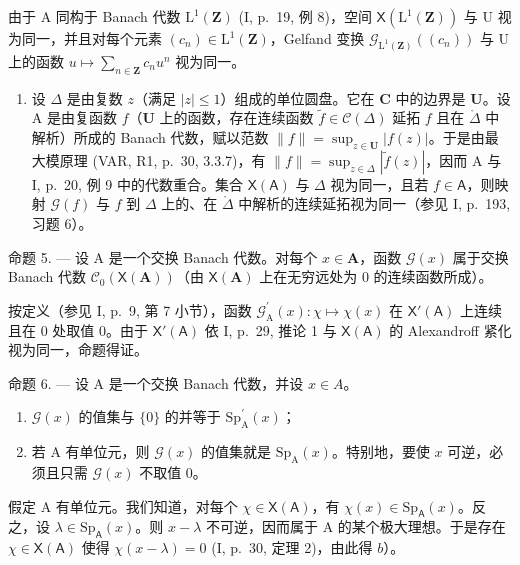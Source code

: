 由于 A 同构于 Banach 代数 \(\mathrm{L}^{1}(\mathbf{Z})\) (I, p.~19, 例 8)，空间 \(\mathsf{X}(\mathrm{L}^{1}(\mathbf{Z}))\) 与 U 视为同一，并且对每个元素 \((c_{n})\in\mathrm{L}^{1}(\mathbf{Z})\)，Gelfand 变换 \(\mathcal{G}_{\mathrm{L}^{1}(\mathbf{Z})}((c_{n}))\) 与 U 上的函数 \(u\mapsto\sum_{n\in\mathbf{Z}}c_{n}u^{n}\) 视为同一。

\begin{enumerate}
\def\labelenumi{\arabic{enumi})}
\setcounter{enumi}{4}
\tightlist
\item
  设 \(\Delta\) 是由复数 \(z\)（满足 \(|z| \leqslant 1\)）组成的单位圆盘。它在 \(\mathbf{C}\) 中的边界是 \(\mathbf{U}\)。设 A 是由复函数 \(f\)（\(\mathbf{U}\) 上的函数，存在连续函数 \(\widetilde{f} \in \mathcal{C}(\Delta)\) 延拓 \(f\) 且在 \(\mathring{\Delta}\) 中解析）所成的 Banach 代数，赋以范数 \(\|f\| = \sup_{z \in \mathbf{U}} |f(z)|\)。于是由最大模原理 (VAR, R1, p.~30, 3.3.7)，有 \(\|f\| = \sup_{z \in \Delta} |\widetilde{f}(z)|\)，因而 A 与 I, p.~20, 例 9 中的代数重合。集合 \(\mathsf{X}(\mathsf{A})\) 与 \(\Delta\) 视为同一，且若 \(f \in \mathsf{A}\)，则映射 \(\mathcal{G}(f)\) 与 \(f\) 到 \(\Delta\) 上的、在 \(\mathring{\Delta}\) 中解析的连续延拓视为同一（参见 I, p.~193, 习题 6）。
\end{enumerate}

命题 5. --- 设 A 是一个交换 Banach 代数。对每个 \(x \in \mathbf{A}\)，函数 \(\mathcal{G}(x)\) 属于交换 Banach 代数 \(\mathcal{C}_0(\mathsf{X}(\mathbf{A}))\)（由 \(\mathsf{X}(\mathbf{A})\) 上在无穷远处为 0 的连续函数所成）。

按定义（参见 I, p.~9, 第 7 小节），函数 \(\mathcal{G}_{\mathrm{A}}^{\prime}(x)\colon \chi \mapsto \chi (x)\) 在 \(\mathsf{X}'(\mathsf{A})\) 上连续且在 0 处取值 0。由于 \(\mathsf{X}'(\mathsf{A})\) 依 I, p.~29, 推论 1 与 \(\mathsf{X}(\mathsf{A})\) 的 Alexandroff 紧化视为同一，命题得证。

命题 6. --- 设 A 是一个交换 Banach 代数，并设 \(x \in A\)。

\begin{enumerate}
\def\labelenumi{\alph{enumi})}
\item
  \(\mathcal{G}(x)\) 的值集与 \(\{0\}\) 的并等于 \(\mathrm{Sp}_{\mathrm{A}}^{\prime}(x)\)；
\item
  若 A 有单位元，则 \(\mathcal{G}(x)\) 的值集就是 \(\mathrm{Sp}_{\mathrm{A}}(x)\)。特别地，要使 \(x\) 可逆，必须且只需 \(\mathcal{G}(x)\) 不取值 0。
\end{enumerate}

假定 A 有单位元。我们知道，对每个 \(\chi \in \mathsf{X}(\mathsf{A})\)，有 \(\chi(x) \in \mathrm{Sp}_{\mathsf{A}}(x)\)。反之，设 \(\lambda \in \mathrm{Sp}_{\mathsf{A}}(x)\)。则 \(x - \lambda\) 不可逆，因而属于 A 的某个极大理想。于是存在 \(\chi \in \mathsf{X}(\mathsf{A})\) 使得 \(\chi(x - \lambda) = 0\) (I, p.~30, 定理 2)，由此得 \(b\)）。

